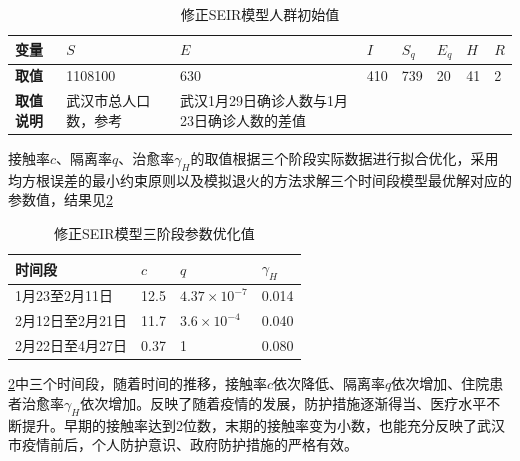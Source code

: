 \documentclass[withoutpre]{cumcmthesis} %
\begin{document}
\begin{table}[H]\small
    \caption{修正SEIR模型人群初始值}
    \label{tab:value} \centering
    \begin{tabular}{p{1.5cm}p{2cm}p{3cm}p{1cm}p{1cm}p{1cm}p{1cm}p{1cm}}
        \toprule[1.5pt]
        \textbf{变量} & $S$ & $E$ & $I$ & $S_q$ & $E_q$ & $H$ & $R$  \\
        \midrule[1pt]
        \textbf{取值} & 1108100& 630& 410& 739& 20& 41&2 \\
        \textbf{取值说明} & 武汉市总人口数，参考 \cite{reference1}& 武汉1月29日确诊人数与1月23日确诊人数的差值&  \cite{reference1}&  \cite{reference1} &  \cite{reference1}& \cite{reference1} &  \cite{reference1}\\
        \bottomrule[1.5pt]
    \end{tabular}
\end{table}

接触率$c$、隔离率$q$、治愈率$\gamma_H$的取值根据三个阶段实际数据进行拟合优化，采用均方根误差的最小约束原则以及模拟退火的方法求解三个时间段模型最优解对应的参数值，结果见\cref{tab:optipara}

\begin{table}[H]
    \caption{修正SEIR模型三阶段参数优化值}
    \label{tab:optipara} \centering
    \begin{tabular}{p{5cm}p{3cm}p{3cm}p{3cm}}
        \toprule[1.5pt]
        \textbf{时间段} & $c$ & $q$ & $\gamma_H$ \\
        \midrule[1pt]
        1月23至2月11日 &12.5&  $4.37 \times 10^{-7}$& 0.014\\
        2月12日至2月21日& 11.7& $3.6\times 10^{-4}$&0.040 \\
        2月22日至4月27日 &0.37&1&0.080 \\
        \bottomrule[1.5pt]
    \end{tabular}
\end{table}

\cref{tab:optipara}中三个时间段，随着时间的推移，接触率$c$依次降低、隔离率$q$依次增加、住院患者治愈率$\gamma_H$依次增加。反映了随着疫情的发展，防护措施逐渐得当、医疗水平不断提升。早期的接触率达到2位数，末期的接触率变为小数，也能充分反映了武汉市疫情前后，个人防护意识、政府防护措施的严格有效。 
\end{document}
